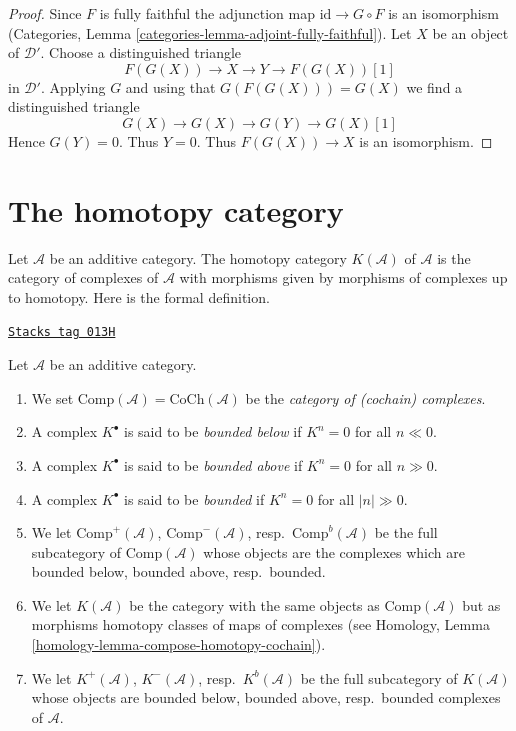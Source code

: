\begin{proof}
Since $F$ is fully faithful the adjunction map $\text{id} \to G \circ F$
is an isomorphism (Categories, Lemma
\ref{categories-lemma-adjoint-fully-faithful}).
Let $X$ be an object of $\mathcal{D}'$.
Choose a distinguished triangle
$$
F(G(X)) \to X \to Y \to F(G(X))[1]
$$
in $\mathcal{D}'$. Applying $G$ and using that $G(F(G(X))) = G(X)$
we find a distinguished triangle
$$
G(X) \to G(X) \to G(Y) \to G(X)[1]
$$
Hence $G(Y) = 0$. Thus $Y = 0$. Thus $F(G(X)) \to X$ is an isomorphism.
\end{proof}

\section{The homotopy category}
\label{derived-section-homotopy}
Let $\mathcal{A}$ be an additive category. The homotopy category
$K(\mathcal{A})$ of $\mathcal{A}$ is the category of complexes of
$\mathcal{A}$ with morphisms given by morphisms of complexes up to homotopy.
Here is the formal definition.

\begin{definition}
\label{derived-definition-complexes-notation}
\href{https://stacks.math.columbia.edu/tag/013H}{\texttt{Stacks tag 013H}}

Let $\mathcal{A}$ be an additive category.
\begin{enumerate}
\item We set $\text{Comp}(\mathcal{A}) = \text{CoCh}(\mathcal{A})$
be the {\it category of (cochain) complexes}.
\item A complex $K^\bullet$ is said to be
{\it bounded below} if $K^n = 0$ for all $n \ll 0$.
\item A complex $K^\bullet$ is said to be
{\it bounded above} if $K^n = 0$ for all $n \gg 0$.
\item A complex $K^\bullet$ is said to be
{\it bounded} if $K^n = 0$ for all $|n| \gg 0$.
\item We let
$\text{Comp}^{+}(\mathcal{A})$, $\text{Comp}^{-}(\mathcal{A})$,
resp.\ $\text{Comp}^b(\mathcal{A})$ be the full subcategory
of $\text{Comp}(\mathcal{A})$ whose objects are the complexes
which are bounded below, bounded above, resp.\ bounded.
\item We let $K(\mathcal{A})$ be the category with the same objects
as $\text{Comp}(\mathcal{A})$ but as morphisms homotopy classes of
maps of complexes (see
Homology, Lemma \ref{homology-lemma-compose-homotopy-cochain}).
\item We let $K^{+}(\mathcal{A})$, $K^{-}(\mathcal{A})$,
resp.\ $K^b(\mathcal{A})$ be the full subcategory of $K(\mathcal{A})$
whose objects are bounded below, bounded above, resp.\ bounded
complexes of $\mathcal{A}$.
\end{enumerate}
\end{definition}

